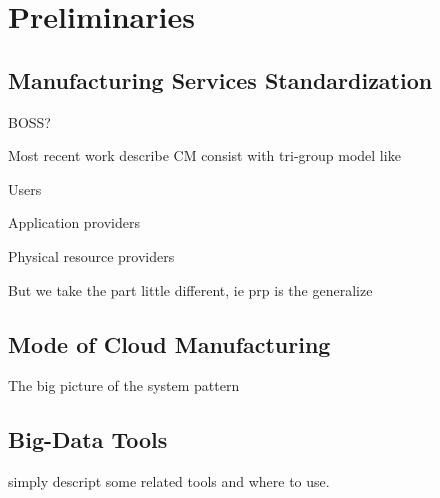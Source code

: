 \section{Preliminaries} %
\subsection{Manufacturing Services Standardization}
BOSS?


Most recent work describe CM consist with tri-group model like \begin{inparaenum}[1)]
\item Users
\item Application providers
\item Physical resource providers
\end{inparaenum}

But we take the part little different, ie prp is the generalize
\subsection{Mode of Cloud Manufacturing}
The big picture of the system pattern

\subsection{Big-Data Tools}
simply descript some related tools and where to use.
